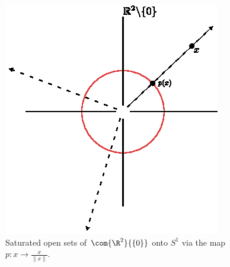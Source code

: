 \begin{example}
\begin{enumerate}
            \begin{figure}[h]
                \centering
                \includegraphics[scale = 1.0]{Figures/chapter2/saturated_rays.eps}
                \caption{Saturated open sets of $\com{\R^2}{\{0\}}$ onto $S^1$
                via the map  $p:x \rightarrow \frac{x}{\|x\|}$.}
                \label{fig_2.4}
            \end{figure}
    \end{enumerate}
\end{example}

